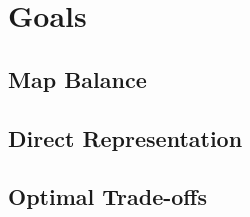 \chapter{Goals}
\label{goals}

\section{Map Balance}
\label{goals_balance}

\section{Direct Representation}
\label{goals_representation}

\section{Optimal Trade-offs}
\label{goals_tradeoffs}